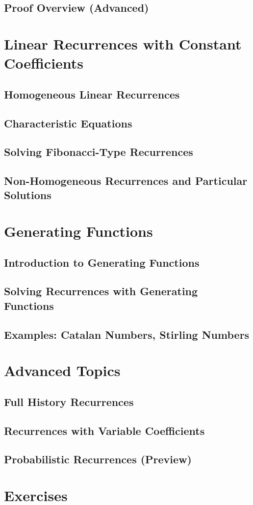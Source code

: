 \subsection{Proof Overview (Advanced)}

\section{Linear Recurrences with Constant Coefficients}
\subsection{Homogeneous Linear Recurrences}
\subsection{Characteristic Equations}
\subsection{Solving Fibonacci-Type Recurrences}
\subsection{Non-Homogeneous Recurrences and Particular Solutions}

\section{Generating Functions}
\subsection{Introduction to Generating Functions}
\subsection{Solving Recurrences with Generating Functions}
\subsection{Examples: Catalan Numbers, Stirling Numbers}

\section{Advanced Topics}
\subsection{Full History Recurrences}
\subsection{Recurrences with Variable Coefficients}
\subsection{Probabilistic Recurrences (Preview)}

\section{Exercises}
